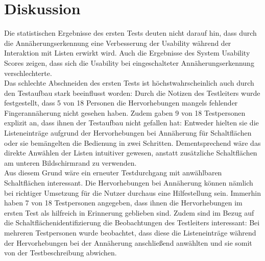 \documentclass[12pt,numbers=noenddot,parskip,bibliography=totocnumbered,listof=totocnumbered]{scrreprt}
\begin{document}
\chapter{Diskussion}
Die statistischen Ergebnisse des ersten Tests deuten nicht darauf hin, dass durch die Annäherungserkennung eine Verbesserung der Usability während der Interaktion mit Listen erwirkt wird. Auch die Ergebnisse des System Usability Scores zeigen, dass sich die Usability bei eingeschalteter Annäherungserkennung verschlechterte.\\
Das schlechte Abschneiden des ersten Tests ist höchstwahrscheinlich auch durch den Testaufbau stark beeinflusst worden: Durch die Notizen des Testleiters wurde festgestellt, dass 5 von 18 Personen die Hervorhebungen mangels fehlender Fingerannäherung nicht gesehen haben. Zudem gaben 9 von 18 Testpersonen explizit an, dass ihnen der Testaufbau nicht gefallen hat: Entweder hielten sie die Listeneinträge aufgrund der Hervorhebungen bei Annäherung für Schaltflächen oder sie bemängelten die Bedienung in zwei Schritten. Dementsprechend wäre das direkte Anwählen der Listen intuitiver gewesen, anstatt zusätzliche Schaltflächen am unteren Bildschirmrand zu verwenden.\\
Aus diesem Grund wäre ein erneuter Testdurchgang mit anwählbaren Schaltflächen interessant. Die Hervorhebungen bei Annäherung können nämlich bei richtiger Umsetzung für die Nutzer durchaus eine Hilfestellung sein. Immerhin haben 7 von 18 Testpersonen angegeben, dass ihnen die Hervorhebungen im ersten Test als hilfreich in Erinnerung geblieben sind. Zudem sind im Bezug auf die Schaltflächenidentifizierung die Beobachtungen des Testleiters interessant: Bei mehreren Testpersonen wurde beobachtet, dass diese die Listeneinträge während der Hervorhebungen bei der Annäherung anschließend anwählten und sie somit von der Testbeschreibung abwichen.
\end{document}
